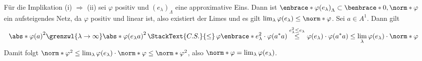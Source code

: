 \begin{beweis}
	Für die Implikation (i) $\Rightarrow$ (ii) sei $\varphi$ positiv und $(e_\lambda)_\Lambda$ eine approximative Eins. 
	Dann ist $\enbrace*{\varphi(e_\lambda)}_\Lambda \subset \benbrace*{0,\norm*{\varphi}}$ ein aufsteigendes Netz, da $\varphi$ positiv und linear ist, also existiert der Limes und es gilt $\lim_\lambda \varphi(e_\lambda) \le \norm*{\varphi}$. 
	Sei $a \in A^1$. Dann gilt
	\[
		\abs*{\varphi(a)}^2 \grenzwl{\lambda\to\infty} \abs*{\varphi(e_\lambda a)}^2\, \StackText{C.S.}{\le}\, \varphi \enbrace*{e_\lambda^2} \cdot \varphi(a^*a) \stackrel{e_\lambda^2 \le e_\lambda}{\le} \varphi(e_\lambda) \cdot \varphi(a^*a) \le \lim_\lambda \varphi(e_\lambda) \cdot \norm*{\varphi}
	\]
	Damit folgt $\norm*{\varphi}^2 \le \lim_\lambda \varphi(e_\lambda) \cdot \norm*{\varphi} \le \norm*{\varphi}^2$, also $\norm*{\varphi}=\lim_\lambda \varphi(e_\lambda)$.
	

\end{beweis}
